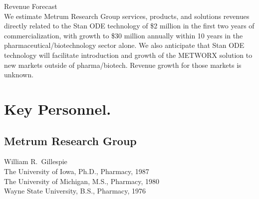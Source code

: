 \noindent
{\sc Revenue Forecast}
\\[2pt]
We estimate Metrum Research Group services, products, and solutions
revenues directly related to the Stan ODE technology of \$2 million in
the first two years of commercialization, with growth to \$30 million
annually within 10 years in the pharmaceutical/biotechnology sector
alone. We also anticipate that Stan ODE technology will facilitate
introduction and growth of the METWORX solution to new markets outside
of pharma/biotech. Revenue growth for those markets is unknown. 


\section{Key Personnel.\label{personnel}}







\subsection{Metrum Research Group}

\noindent
{\sc William R.\ Gillespie}
\\[2pt]
The University of Iowa, Ph.D., Pharmacy, 1987 \\
The University of Michigan, M.S., Pharmacy, 1980 \\
Wayne State University, B.S., Pharmacy, 1976
\\

